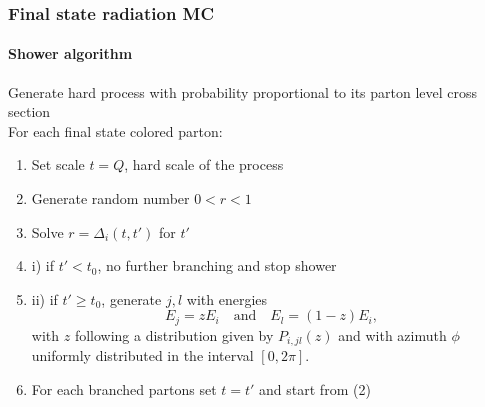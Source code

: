 \documentclass[aspectratio=43]{beamer}
\begin{document}
\begin{frame}

	\frametitle{Final state radiation MC}
	\framesubtitle{Shower algorithm}
	
	\footnotesize Generate hard process with probability proportional to its parton level cross section \\
	\footnotesize For each final state colored parton:
	\begin{enumerate} 
		\item \footnotesize Set scale $t = Q$, hard scale of the process
		\item \footnotesize Generate random number $0 < r < 1$
		\item \footnotesize Solve $r = \Delta_{i}(t, t')$ for $t'$
		\item \footnotesize i) if $t' < t_{0}$, no further branching and stop shower
		\item \footnotesize ii) if $t' \geq t_{0}$, generate $j, l$ with energies $$E_{j} = zE_{i} \quad \textrm{and}\quad E_{l} = (1 - z)E_{i}, $$ with $z$ following a distribution given by  $P_{i, jl}(z)$ and with azimuth $\phi$ uniformly distributed in the interval $[0, 2\pi]$.
		\item \footnotesize For each branched partons set $t = t'$ and start from (2)
	\end{enumerate}

\end{frame}
\end{document}
